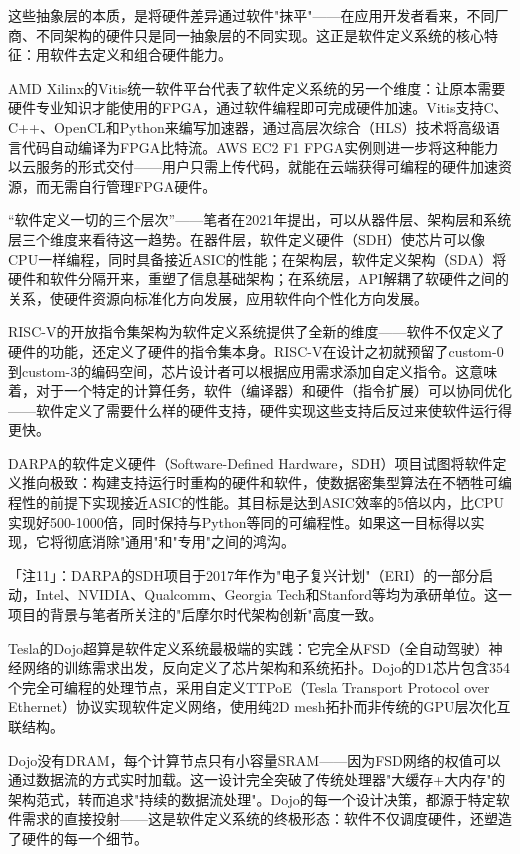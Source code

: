 \documentclass[11pt,a4paper]{article}
\begin{document}
这些抽象层的本质，是将硬件差异通过软件"抹平"——在应用开发者看来，不同厂商、不同架构的硬件只是同一抽象层的不同实现。这正是软件定义系统的核心特征：用软件去定义和组合硬件能力。

AMD Xilinx的Vitis统一软件平台代表了软件定义系统的另一个维度：让原本需要硬件专业知识才能使用的FPGA，通过软件编程即可完成硬件加速。Vitis支持C、C++、OpenCL和Python来编写加速器，通过高层次综合（HLS）技术将高级语言代码自动编译为FPGA比特流。AWS EC2 F1 FPGA实例则进一步将这种能力以云服务的形式交付——用户只需上传代码，就能在云端获得可编程的硬件加速资源，而无需自行管理FPGA硬件。

``软件定义一切的三个层次''——笔者在2021年提出，可以从器件层、架构层和系统层三个维度来看待这一趋势。在器件层，软件定义硬件（SDH）使芯片可以像CPU一样编程，同时具备接近ASIC的性能；在架构层，软件定义架构（SDA）将硬件和软件分隔开来，重塑了信息基础架构；在系统层，API解耦了软硬件之间的关系，使硬件资源向标准化方向发展，应用软件向个性化方向发展。

RISC-V的开放指令集架构为软件定义系统提供了全新的维度——软件不仅定义了硬件的功能，还定义了硬件的指令集本身。RISC-V在设计之初就预留了custom-0到custom-3的编码空间，芯片设计者可以根据应用需求添加自定义指令。这意味着，对于一个特定的计算任务，软件（编译器）和硬件（指令扩展）可以协同优化——软件定义了需要什么样的硬件支持，硬件实现这些支持后反过来使软件运行得更快。

DARPA的软件定义硬件（Software-Defined Hardware，SDH）项目试图将软件定义推向极致：构建支持运行时重构的硬件和软件，使数据密集型算法在不牺牲可编程性的前提下实现接近ASIC的性能。其目标是达到ASIC效率的5倍以内，比CPU实现好500-1000倍，同时保持与Python等同的可编程性。如果这一目标得以实现，它将彻底消除"通用"和"专用"之间的鸿沟。

「注11」：DARPA的SDH项目于2017年作为"电子复兴计划"（ERI）的一部分启动，Intel、NVIDIA、Qualcomm、Georgia Tech和Stanford等均为承研单位。这一项目的背景与笔者所关注的"后摩尔时代架构创新"高度一致。

Tesla的Dojo超算是软件定义系统最极端的实践：它完全从FSD（全自动驾驶）神经网络的训练需求出发，反向定义了芯片架构和系统拓扑。Dojo的D1芯片包含354个完全可编程的处理节点，采用自定义TTPoE（Tesla Transport Protocol over Ethernet）协议实现软件定义网络，使用纯2D mesh拓扑而非传统的GPU层次化互联结构。

Dojo没有DRAM，每个计算节点只有小容量SRAM——因为FSD网络的权值可以通过数据流的方式实时加载。这一设计完全突破了传统处理器"大缓存+大内存"的架构范式，转而追求"持续的数据流处理"。Dojo的每一个设计决策，都源于特定软件需求的直接投射——这是软件定义系统的终极形态：软件不仅调度硬件，还塑造了硬件的每一个细节。
\end{document}
